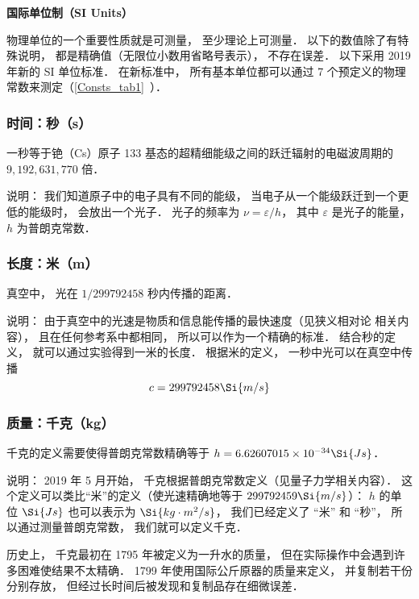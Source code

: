 


\textbf{国际单位制（SI Units）}

物理单位的一个重要性质就是可测量， 至少理论上可测量． 以下的数值除了有特殊说明， 都是精确值（无限位小数用省略号表示）， 不存在误差． 以下采用 2019 年新的 SI 单位标准． 在新标准中， 所有基本单位都可以通过 7 个预定义的物理常数来测定（\autoref{Consts_tab1}~）．

\subsubsection{时间：秒（s）}
一秒等于铯（Cs）原子 133 基态的超精细能级之间的跃迁辐射的电磁波周期的 $9,192,631,770$ 倍． 

说明： 我们知道原子中的电子具有不同的能级， 当电子从一个能级跃迁到一个更低的能级时， 会放出一个光子． 光子的频率为 $\nu  = \varepsilon /h$，   其中 $\varepsilon $ 是光子的能量， $h$ 为普朗克常数．

\subsubsection{长度：米（m）}
真空中， 光在 $1/299792458$ 秒内传播的距离．

说明： 由于真空中的光速是物质和信息能传播的最快速度（见狭义相对论 相关内容）， 且在任何参考系中都相同， 所以可以作为一个精确的标准． 结合秒的定义， 就可以通过实验得到一米的长度． 根据米的定义， 一秒中光可以在真空中传播
\begin{equation}
c = 299792458 \Si{m/s}
\end{equation}

\subsubsection{质量：千克（kg）}
千克的定义需要使得普朗克常数精确等于 $h = 6.62607015\times10^{-34}\Si{Js}$．

说明： 2019 年 5 月开始， 千克根据普朗克常数定义（见量子力学相关内容）． 这个定义可以类比“米”的定义（使光速精确地等于 $299792459\Si{m/s}$）： $h$ 的单位 $\Si{Js}$ 也可以表示为 $\Si{kg\cdot m^2/s}$， 我们已经定义了 “米” 和 “秒”， 所以通过测量普朗克常数， 我们就可以定义千克．

历史上， 千克最初在 1795 年被定义为一升水的质量， 但在实际操作中会遇到许多困难使结果不太精确． 1799 年使用国际公斤原器的质量来定义， 并复制若干份分别存放， 但经过长时间后被发现和复制品存在细微误差．

